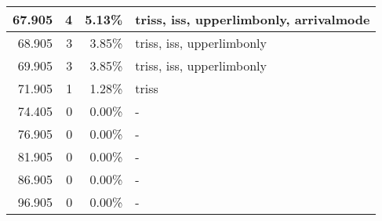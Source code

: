 \begin{table}[htbp]
{\begin{tabular}{|r|r|r|p{9.5cm}|}
67.905 & 4 & 5.13\% & triss, iss, upperlimbonly, arrivalmode \\ \hline
68.905 & 3 & 3.85\% & triss, iss, upperlimbonly \\ \hline
69.905 & 3 & 3.85\% & triss, iss, upperlimbonly \\ \hline
71.905 & 1 & 1.28\% & triss \\ \hline
74.405 & 0 & 0.00\% & - \\ \hline
76.905 & 0 & 0.00\% & - \\ \hline
81.905 & 0 & 0.00\% & - \\ \hline
86.905 & 0 & 0.00\% & - \\ \hline
96.905 & 0 & 0.00\% & - \\ \hline
\end{tabular}}
\end{table}
